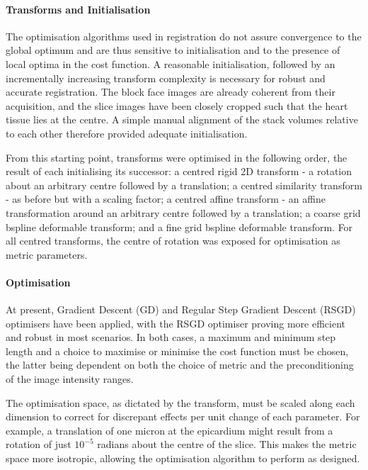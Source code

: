       \paragraph{Transforms and Initialisation}
        The optimisation algorithms used in registration do not assure convergence to the global optimum and are thus sensitive to initialisation and to the presence of local optima in the cost function. A reasonable initialisation, followed by an incrementally increasing transform complexity is necessary for robust and accurate registration. The block face images are already coherent from their acquisition, and the slice images have been closely cropped such that the heart tissue lies at the centre. A simple manual alignment of the stack volumes relative to each other therefore provided adequate initialisation.

        From this starting point, transforms were optimised in the following order, the result of each initialising its successor: a centred rigid 2D transform - a rotation about an arbitrary centre followed by a translation; a centred similarity transform - as before but with a scaling factor; a centred affine transform - an affine transformation around an arbitrary centre followed by a translation; a coarse grid bspline deformable transform; and a fine grid bspline deformable transform. For all centred transforms, the centre of rotation was exposed for optimisation as metric parameters.

      \paragraph{Optimisation}
      At present, Gradient Descent (GD) and Regular Step Gradient Descent (RSGD) optimisers have been applied, with the RSGD optimiser proving more efficient and robust in most scenarios. In both cases, a maximum and minimum step length and a choice to maximise or minimise the cost function must be chosen, the latter being dependent on both the choice of metric and the preconditioning of the image intensity ranges.

      The optimisation space, as dictated by the transform, must be scaled along each dimension to correct for discrepant effects per unit change of each parameter. For example, a translation of one micron at the epicardium might result from a rotation of just $10^{-5}$ radians about the centre of the slice. This makes the metric space more isotropic, allowing the optimisation algorithm to perform as designed.

